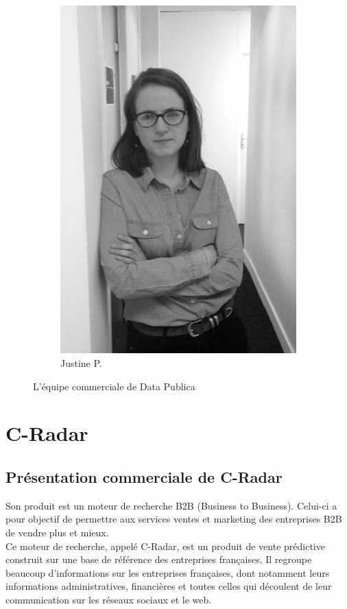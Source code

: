 \begin{figure}[h!]
\begin{subfigure}[b]{0.2\textwidth}
                \includegraphics[width=\textwidth]{images/Justine-serieuse-crop.jpg}
                \caption{Justine P.}
            \end{subfigure}
            \caption{L'équipe commerciale de Data Publica}
            \label{fig:teamc_data_publica}
        \end{figure}

\section{C-Radar}\label{c_radar}
    \subsection{Présentation commerciale de C-Radar}
        Son produit est un moteur de recherche B2B (Business to Business). Celui-ci a pour objectif de permettre aux services ventes et marketing des entreprises B2B de vendre plus et mieux.\\
        Ce moteur de recherche, appelé C-Radar, est un produit de vente prédictive construit sur une base de référence des entreprises françaises. Il regroupe beaucoup d'informations sur les entreprises françaises, dont notamment leurs informations administratives, financières et toutes celles qui découlent de leur communication sur les réseaux sociaux et le web.\\

